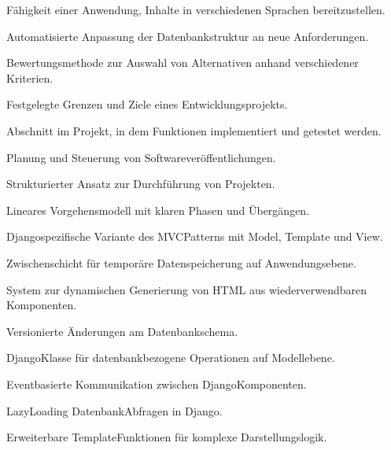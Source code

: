 \documentclass[a4paper,12pt,ngerman]{sphinxmanual}
\begin{document}
\sphinxAtStartPar
{}
Fähigkeit einer Anwendung, Inhalte in verschiedenen Sprachen bereitzustellen.

\sphinxAtStartPar
{}
Automatisierte Anpassung der Datenbankstruktur an neue Anforderungen.

\sphinxAtStartPar
{}
Bewertungsmethode zur Auswahl von Alternativen anhand verschiedener Kriterien.

\sphinxAtStartPar
{}
Festgelegte Grenzen und Ziele eines Entwicklungsprojekts.

\sphinxAtStartPar
{}
Abschnitt im Projekt, in dem Funktionen implementiert und getestet werden.

\sphinxAtStartPar
{}
Planung und Steuerung von Softwareveröffentlichungen.

\sphinxAtStartPar
{}
Strukturierter Ansatz zur Durchführung von Projekten.

\sphinxAtStartPar
{}
Lineares Vorgehensmodell mit klaren Phasen und Übergängen.

\sphinxAtStartPar
{}
Django\sphinxhyphen{}spezifische Variante des MVC\sphinxhyphen{}Patterns mit Model, Template und View.

\sphinxAtStartPar
{}
Zwischenschicht für temporäre Datenspeicherung auf Anwendungsebene.

\sphinxAtStartPar
{}
System zur dynamischen Generierung von HTML aus wiederverwendbaren Komponenten.

\sphinxAtStartPar
{}
Versionierte Änderungen am Datenbankschema.

\sphinxAtStartPar
{}
Django\sphinxhyphen{}Klasse für datenbankbezogene Operationen auf Modellebene.

\sphinxAtStartPar
{}
Event\sphinxhyphen{}basierte Kommunikation zwischen Django\sphinxhyphen{}Komponenten.

\sphinxAtStartPar
{}
Lazy\sphinxhyphen{}Loading Datenbank\sphinxhyphen{}Abfragen in Django.

\sphinxAtStartPar
{}
Erweiterbare Template\sphinxhyphen{}Funktionen für komplexe Darstellungslogik.
\end{document}
